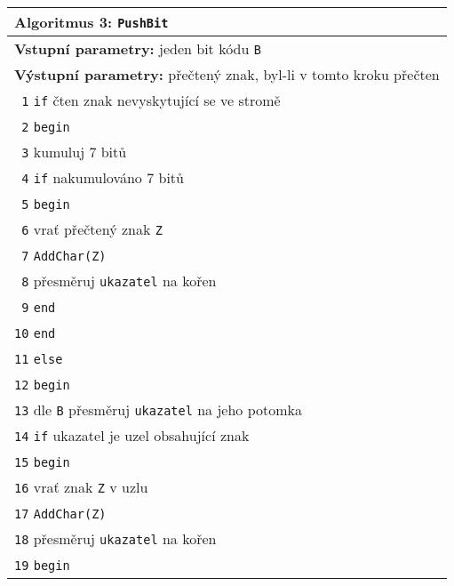 \begin{table}[!h]
\centering
\begin{tabular}{|l|}
\hline
\textbf{Algoritmus 3:} \texttt{PushBit}\\
\hline
\textbf{Vstupní parametry:} jeden bit kódu \texttt{B}\\
\textbf{Výstupní parametry:} přečtený znak, byl-li v tomto kroku přečten\\
\hline
\texttt{ 1} \texttt{if} čten znak nevyskytující se ve stromě\\
\texttt{ 2} \texttt{begin}\\
\texttt{ 3} \hspace*{5mm}kumuluj 7 bitů\\
\texttt{ 4} \hspace*{5mm}\texttt{if} nakumulováno 7 bitů\\
\texttt{ 5} \hspace*{5mm}\texttt{begin}\\
\texttt{ 6} \hspace*{10mm}vrať přečtený znak \texttt{Z}\\
\texttt{ 7} \hspace*{10mm}\texttt{AddChar(Z)}\\
\texttt{ 8} \hspace*{10mm}přesměruj \texttt{ukazatel} na kořen\\
\texttt{ 9} \hspace*{5mm}\texttt{end}\\
\texttt{10} \texttt{end}\\
\texttt{11} \texttt{else}\\
\texttt{12} \texttt{begin}\\
\texttt{13} \hspace*{5mm}dle \texttt{B} přesměruj \texttt{ukazatel} na jeho potomka\\
\texttt{14} \hspace*{5mm}\texttt{if} ukazatel je uzel obsahující znak\\
\texttt{15} \hspace*{5mm}\texttt{begin}\\
\texttt{16} \hspace*{10mm}vrať znak \texttt{Z} v uzlu\\
\texttt{17} \hspace*{10mm}\texttt{AddChar(Z)}\\
\texttt{18} \hspace*{10mm}přesměruj \texttt{ukazatel} na kořen\\
\texttt{19} \hspace*{5mm}\texttt{begin}\\

\end{tabular}
\end{table}
